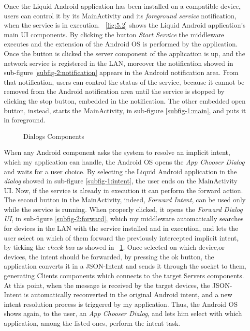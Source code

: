 Once the Liquid Android application has been installed on a compatible device, users can control it by its MainActivity and its \textit{foreground service} notification, when the service is in execution. \figurename~\ref{fig:5.2} shows the Liquid Android application's main UI components. By clicking the button \textit{Start Service} the middleware executes and the extension of the Android OS is performed by the application. Once the button is clicked the server component of the application is up, and the network service is registered in the LAN, moreover the notification showed in sub-figure \ref{subfig-2:notification} appears in the Android notification area. From that notification, users can control the status of the service, because it cannot be removed from the Android notification area until the service is stopped by clicking the stop button, embedded in the notification. The other embedded open button, instead, starts the MainActivity, in sub-figure \ref{subfig-1:main}, and puts it in foreground.\\
\begin{figure}[h]
	\centering
	\begin{minipage}{.49\textwidth}\centering
	\end{minipage}
	\begin{minipage}{.49\textwidth}\centering
	\end{minipage}
	\caption{Dialogs Components}
	\label{fig:5.3}
\end{figure}
When any Android component asks the system to resolve an implicit intent, which my application can handle, the Android OS opens the \textit{App Chooser Dialog} and waits for a user choice. By selecting the Liquid Android application in the \textit{dialog} showed in sub-figure \ref{subfig-1:intent}, the user ends on the MainActivity UI. Now, if the service is already in execution it can perform the forward action. The second button in the MainActivity, indeed, \textit{Forward Intent}, can be used only while the service is running. When properly clicked, it opens the \textit{Forward Dialog UI}, in sub-figure \ref{subfig-2:forward}, which my middleware automatically searches for devices in the LAN with the service installed and in execution, and lets the user select on which of them forward the previously intercepted implicit intent, by ticking the \textit{check-box} as showed in \figurename~\ref{fig:5.3}. Once selected on which device,or devices, the intent should be forwarded, by pressing the ok button, the application converts it in a JSON-Intent and sends it through the socket to them, generating Clients components which connects to the target Servers components. At this point, when the message is received by the target devices, the JSON-Intent is automatically reconverted in the original Android intent, and a new intent resolution process is triggered by my application. Thus, the Android OS shows again, to the user, an \textit{App Chooser Dialog}, and lets him select with which application, among the listed ones, perform the intent task.
